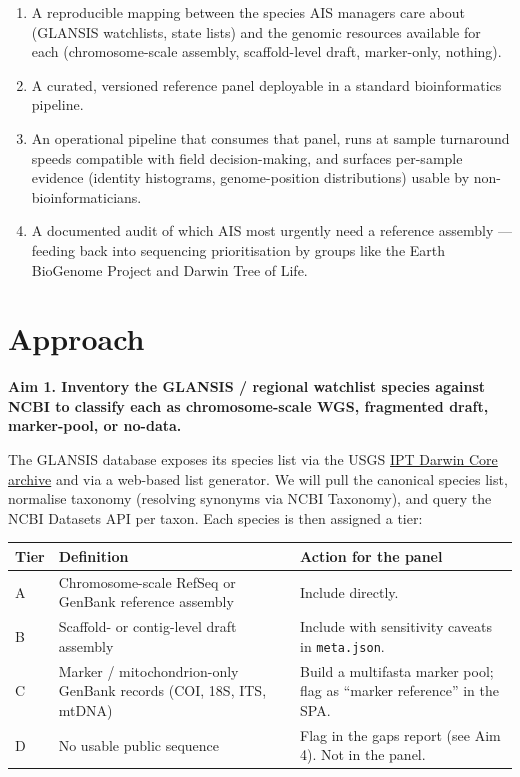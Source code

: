\documentclass[11pt, letterpaper]{article}
\newcommand{\aim}[1]{%
  \par\medskip%
  \noindent\colorbox{black!4}{%
    \parbox{\dimexpr\linewidth-2\fboxsep}{\textbf{#1}}%
  }\par\medskip%
}
\begin{document}
\begin{enumerate}[leftmargin=1.5em]
  \item A reproducible mapping between the species AIS managers care about (GLANSIS watchlists, state lists) and the genomic resources available for each (chromosome-scale assembly, scaffold-level draft, marker-only, nothing).
  \item A curated, versioned reference panel deployable in a standard bioinformatics pipeline.
  \item An operational pipeline that consumes that panel, runs at sample turnaround speeds compatible with field decision-making, and surfaces per-sample evidence (identity histograms, genome-position distributions) usable by non-bioinformaticians.
  \item A documented audit of which AIS most urgently need a reference assembly --- feeding back into sequencing prioritisation by groups like the Earth BioGenome Project and Darwin Tree of Life.
\end{enumerate}

\section{Approach}

\aim{Aim 1. Inventory the GLANSIS / regional watchlist species against NCBI to classify each as chromosome-scale WGS, fragmented draft, marker-pool, or no-data.}

The GLANSIS database exposes its species list via the USGS \href{https://nas.er.usgs.gov/ipt/resource?r=nas_glansis}{IPT Darwin Core archive} and via a web-based list generator. We will pull the canonical species list, normalise taxonomy (resolving synonyms via NCBI Taxonomy), and query the NCBI Datasets API per taxon. Each species is then assigned a tier:

\begin{center}
\begin{tabularx}{\textwidth}{l l X}
\toprule
\textbf{Tier} & \textbf{Definition} & \textbf{Action for the panel} \\
\midrule
A & Chromosome-scale RefSeq or GenBank reference assembly & Include directly. \\
B & Scaffold- or contig-level draft assembly & Include with sensitivity caveats in \texttt{meta.json}. \\
C & Marker / mitochondrion-only GenBank records (COI, 18S, ITS, mtDNA) & Build a multifasta marker pool; flag as ``marker reference'' in the SPA. \\
D & No usable public sequence & Flag in the gaps report (see Aim 4). Not in the panel. \\
\bottomrule
\end{tabularx}
\end{center}
\end{document}
